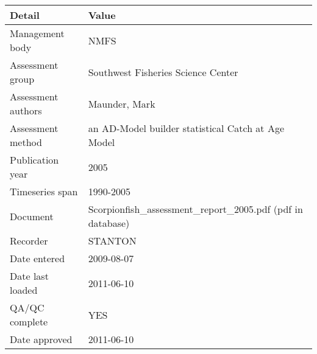 \begin{table}[htb]
\centering
\begin{tabular}{lp{7cm}}
\toprule
Detail & Value \\
\midrule
Management body    & NMFS                                                         \\
Assessment group   & Southwest Fisheries Science Center                           \\
Assessment authors & Maunder, Mark                                                \\
Assessment method  & an AD-Model builder statistical Catch at Age Model           \\
Publication year   & 2005                                                         \\
Timeseries span    & 1990-2005                                                    \\
Document           & Scorpionfish\_assessment\_report\_2005.pdf (pdf in database) \\
Recorder           & STANTON                                                      \\
Date entered       & 2009-08-07                                                   \\
Date last loaded   & 2011-06-10                                                   \\
QA/QC complete     & YES                                                          \\
Date approved      & 2011-06-10                                                   \\
\bottomrule
\end{tabular}
\label{tab:assessdet}
\end{table}
